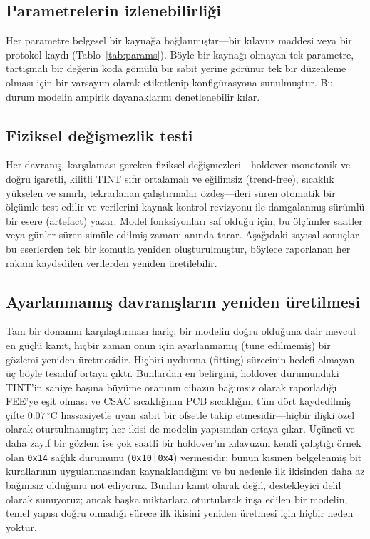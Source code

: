 \documentclass[conference]{IEEEtran}
\begin{document}
\subsection{Parametrelerin izlenebilirliği}
Her parametre belgesel bir kaynağa bağlanmıştır---bir kılavuz maddesi veya bir protokol kaydı (Tablo~\ref{tab:params}). Böyle bir kaynağı olmayan tek parametre, tartışmalı bir değerin koda gömülü bir sabit yerine görünür tek bir düzenleme olması için bir varsayım olarak etiketlenip konfigürasyona sunulmuştur. Bu durum modelin ampirik dayanaklarını denetlenebilir kılar.

\subsection{Fiziksel değişmezlik testi}
Her davranış, karşılaması gereken fiziksel değişmezleri---holdover monotonik ve doğru işaretli, kilitli TINT sıfır ortalamalı ve eğilimsiz (trend-free), sıcaklık yükselen ve sınırlı, tekrarlanan çalıştırmalar özdeş---ileri süren otomatik bir ölçümle test edilir ve verilerini kaynak kontrol revizyonu ile damgalanmış sürümlü bir esere (artefact) yazar. Model fonksiyonları saf olduğu için, bu ölçümler saatler veya günler süren simüle edilmiş zamanı anında tarar. Aşağıdaki sayısal sonuçlar bu eserlerden tek bir komutla yeniden oluşturulmuştur, böylece raporlanan her rakam kaydedilen verilerden yeniden üretilebilir.

\subsection{Ayarlanmamış davranışların yeniden üretilmesi}
Tam bir donanım karşılaştırması hariç, bir modelin doğru olduğuna dair mevcut en güçlü kanıt, hiçbir zaman onun için ayarlanmamış (tune edilmemiş) bir gözlemi yeniden üretmesidir. Hiçbiri uydurma (fitting) sürecinin hedefi olmayan üç böyle tesadüf ortaya çıktı. Bunlardan en belirgini, holdover durumundaki TINT'in saniye başına büyüme oranının cihazın bağımsız olarak raporladığı FEE'ye eşit olması ve CSAC sıcaklığının PCB sıcaklığını tüm dört kaydedilmiş çifte $0.07\,^\circ$C hassasiyetle uyan sabit bir ofsetle takip etmesidir---hiçbir ilişki özel olarak oturtulmamıştır; her ikisi de modelin yapısından ortaya çıkar. Üçüncü ve daha zayıf bir gözlem ise çok saatli bir holdover'ın kılavuzun kendi çalıştığı örnek olan \texttt{0x14} sağlık durumunu (\texttt{0x10}\,$\vert$\,\texttt{0x4}) vermesidir; bunun kısmen belgelenmiş bit kurallarının uygulanmasından kaynaklandığını ve bu nedenle ilk ikisinden daha az bağımsız olduğunu not ediyoruz. Bunları kanıt olarak değil, destekleyici delil olarak sunuyoruz; ancak başka miktarlara oturtularak inşa edilen bir modelin, temel yapısı doğru olmadığı sürece ilk ikisini yeniden üretmesi için hiçbir neden yoktur.
\end{document}
